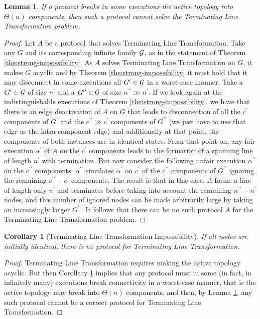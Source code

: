 \documentclass[preprint]{elsarticle}
\newcommand{\dprime}{{\prime\prime}}
\newtheorem{lemma}{Lemma}
\newtheorem{corollary}{Corollary}
\begin{document}
\begin{lemma} \label{lem:line-impossibility}
If a protocol breaks in some executions the active topology into $\Theta(n)$ components, then such a protocol cannot solve the Terminating Line Transformation problem.
\end{lemma}
\begin{proof}
Let $A$ be a protocol that solves Terminating Line Transformation. Take any $G$ and its corresponding infinite family $\cal{G}$, as in the statement of Theorem \ref{the:strong-impossibility}. As $A$ solves Terminating Line Transformation on $G$, it makes $G$ acyclic and by Theorem \ref{the:strong-impossibility} it must hold that it may disconnect in some executions all $G^\prime\in\cal{G}$ in a worst-case manner. Take a $G^\prime\in\cal{G}$ of size $n^\prime$ and a $G^{\dprime}\in\cal{G}$ of size $n^{\dprime}\gg n^\prime$. If we look again at the indistinguishable executions of Theorem \ref{the:strong-impossibility}, we have that there is an edge deactivation of $A$ on $G$ that leads to disconnection of all the $c^\prime$ components of $G^\prime$ and the $c^{\dprime}\gg c^\prime$ components of $G^{\dprime}$ (we just have to use that edge as the intra-component edge) and additionally at that point, the components of both instances are in identical states. From that point on, any fair execution $\alpha^{\prime}$ of $A$ on the $c^\prime$ components leads to the formation of a spanning line of length $n^\prime$ with termination. But now consider the following unfair execution $\alpha^{\dprime}$ on the $c^{\dprime}$ components: $\alpha^{\dprime}$ simulates $\alpha^{\prime}$ on $c^\prime$ of the $c^{\dprime}$ components of $G^{\dprime}$ ignoring the remaining $c^{\dprime}-c^\prime$ components. The result is that in this case, $A$ forms a line of length only $n^\prime$ and terminates before taking into account the remaining $n^{\dprime}-n^\prime$ nodes, and this number of ignored nodes can be made arbitrarily large by taking an increasingly larger $G^{\dprime}$. It follows that there can be no such protocol $A$ for the Terminating Line Transformation problem.
\end{proof}

\begin{corollary} [Terminating Line Transformation Impossibility] \label{cor:line-impossibility}
If all nodes are initially identical, there is no protocol for Terminating Line Transformation.
\end{corollary}
\begin{proof}
Terminating Line Transformation requires making the active topology acyclic. But then Corollary \ref{cor:line-impossibility} implies that any protocol must in some (in fact, in infinitely many) executions break connectivity in a worst-case manner, that is the active topology may break into $\Theta(n)$ components, and then, by Lemma \ref{lem:line-impossibility}, any such protocol cannot be a correct protocol for Terminating Line Transformation.
\end{proof}
\end{document}
